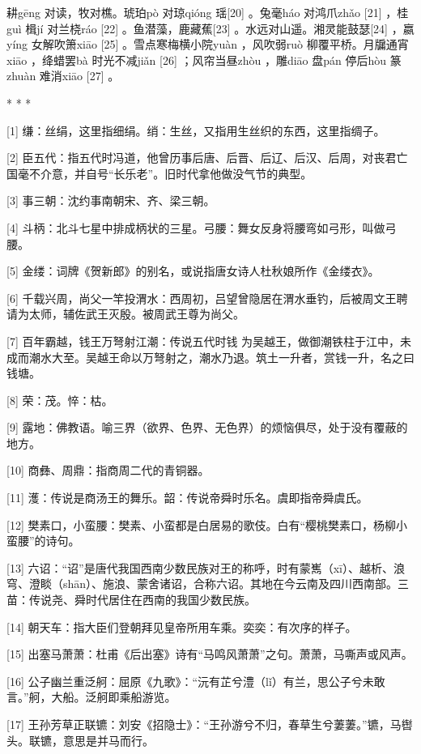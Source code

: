 \documentclass[12pt,UTF8]{ctexbook}
\begin{document}
耕gēng 对读，牧对樵。琥珀pò 对琼qióng 瑶[20] 。兔毫háo 对鸿爪zhǎo [21] ，桂guì 楫jí 对兰桡ráo [22] 。鱼潜藻，鹿藏蕉[23] 。水远对山遥。湘灵能鼓瑟[24] ，嬴yíng 女解吹箫xiāo [25] 。雪点寒梅横小院yuàn ，风吹弱ruò 柳覆平桥。月牖通宵xiāo ，绛蜡罢bà 时光不减jiǎn [26] ；风帘当昼zhòu ，雕diāo 盘pán 停后hòu 篆zhuàn 难消xiāo [27] 。



* * *



[1] 缣：丝绢，这里指细绢。绡：生丝，又指用生丝织的东西，这里指绸子。

[2] 臣五代：指五代时冯道，他曾历事后唐、后晋、后辽、后汉、后周，对丧君亡国毫不介意，并自号“长乐老”。旧时代拿他做没气节的典型。

[3] 事三朝：沈约事南朝宋、齐、梁三朝。

[4] 斗柄：北斗七星中排成柄状的三星。弓腰：舞女反身将腰弯如弓形，叫做弓腰。

[5] 金缕：词牌《贺新郎》的别名，或说指唐女诗人杜秋娘所作《金缕衣》。

[6] 千载兴周，尚父一竿投渭水：西周初，吕望曾隐居在渭水垂钓，后被周文王聘请为太师，辅佐武王灭殷。被周武王尊为尚父。

[7] 百年霸越，钱王万弩射江潮：传说五代时钱 为吴越王，做御潮铁柱于江中，未成而潮水大至。吴越王命以万弩射之，潮水乃退。筑土一升者，赏钱一升，名之曰钱塘。

[8] 荣：茂。悴：枯。

[9] 露地：佛教语。喻三界（欲界、色界、无色界）的烦恼俱尽，处于没有覆蔽的地方。

[10] 商彝、周鼎：指商周二代的青铜器。

[11] 濩：传说是商汤王的舞乐。韶：传说帝舜时乐名。虞即指帝舜虞氏。

[12] 樊素口，小蛮腰：樊素、小蛮都是白居易的歌伎。白有“樱桃樊素口，杨柳小蛮腰”的诗句。

[13] 六诏：“诏”是唐代我国西南少数民族对王的称呼，时有蒙嶲（xī）、越析、浪穹、澄睒（shān）、施浪、蒙舍诸诏，合称六诏。其地在今云南及四川西南部。三苗：传说尧、舜时代居住在西南的我国少数民族。

[14] 朝天车：指大臣们登朝拜见皇帝所用车乘。奕奕：有次序的样子。

[15] 出塞马萧萧：杜甫《后出塞》诗有“马鸣风萧萧”之句。萧萧，马嘶声或风声。

[16] 公子幽兰重泛舸：屈原《九歌》：“沅有芷兮澧（lǐ）有兰，思公子兮未敢言。”舸，大船。泛舸即乘船游览。

[17] 王孙芳草正联镳：刘安《招隐士》：“王孙游兮不归，春草生兮萋萋。”镳，马辔头。联镳，意思是并马而行。
\end{document}
